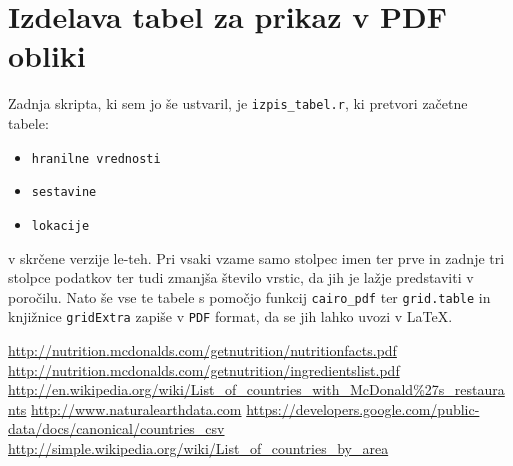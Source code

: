 \documentclass[hidelinks, 11pt,a4paper]{article}
\begin{document}
\newpage
\section{Izdelava tabel za prikaz v PDF obliki}

Zadnja skripta, ki sem jo še ustvaril, je \verb|izpis_tabel.r|, ki pretvori začetne tabele:

\begin{itemize}
	\item \verb|hranilne vrednosti|
	\item \verb|sestavine|
	\item \verb|lokacije|
\end{itemize}

\noindent
v skrčene verzije le-teh. Pri vsaki vzame samo stolpec imen ter prve in zadnje tri stolpce podatkov ter tudi zmanjša število vrstic, da jih je lažje predstaviti v poročilu. Nato še vse te tabele s pomočjo funkcij \verb|cairo_pdf| ter \verb|grid.table| in knjižnice \verb|gridExtra| zapiše v \verb|PDF| format, da se jih lahko uvozi v \LaTeX.

\newpage
\begin{thebibliography}{99}
	 \url{http://nutrition.mcdonalds.com/getnutrition/nutritionfacts.pdf}
	 \url{http://nutrition.mcdonalds.com/getnutrition/ingredientslist.pdf}
	 \url{http://en.wikipedia.org/wiki/List_of_countries_with_McDonald%27s_restaurants}
	 \url{http://www.naturalearthdata.com}
	 \url{https://developers.google.com/public-data/docs/canonical/countries_csv}
	 \url{http://simple.wikipedia.org/wiki/List_of_countries_by_area}
\end{thebibliography}
\end{document}
